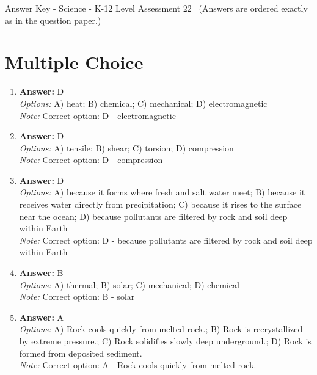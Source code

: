 \documentclass[12pt]{article}
\begin{document}
\begin{center}
Answer Key - Science - K-12 Level Assessment 22 \
\small (Answers are ordered exactly as in the question paper.)
\end{center}

\section*{Multiple Choice}
\begin{enumerate}[label=\arabic*.]
\item \textbf{Answer:} D
\\ \textit{Options:} A) heat; B) chemical; C) mechanical; D) electromagnetic
\\ \textit{Note:} Correct option: D - electromagnetic
\item \textbf{Answer:} D
\\ \textit{Options:} A) tensile; B) shear; C) torsion; D) compression
\\ \textit{Note:} Correct option: D - compression
\item \textbf{Answer:} D
\\ \textit{Options:} A) because it forms where fresh and salt water meet; B) because it receives water directly from precipitation; C) because it rises to the surface near the ocean; D) because pollutants are filtered by rock and soil deep within Earth
\\ \textit{Note:} Correct option: D - because pollutants are filtered by rock and soil deep within Earth
\item \textbf{Answer:} B
\\ \textit{Options:} A) thermal; B) solar; C) mechanical; D) chemical
\\ \textit{Note:} Correct option: B - solar
\item \textbf{Answer:} A
\\ \textit{Options:} A) Rock cools quickly from melted rock.; B) Rock is recrystallized by extreme pressure.; C) Rock solidifies slowly deep underground.; D) Rock is formed from deposited sediment.
\\ \textit{Note:} Correct option: A - Rock cools quickly from melted rock.
\end{enumerate}
\end{document}
